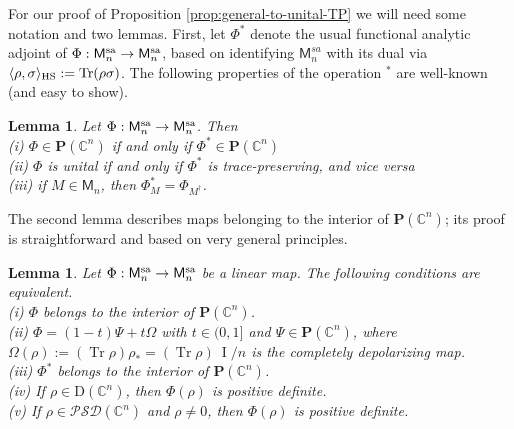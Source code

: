 \documentclass[10pt]{article}
\DeclareMathOperator{\tr}{Tr}
\DeclareMathOperator{\Id}{I}
\newcommand{\cD}{\mathrm{D}}
\newcommand{\PSD}{\mathcal{PSD}}
\newcommand{\cP}{\bm{P}}
\newcommand{\C}{\mathbb{C}}
\newcommand{\cM}{\mathsf{M}}
\newcommand{\scalar}[2]{\langle #1 , #2\rangle}
\newcommand{\sa}{\textnormal{sa}}
\newcommand{\HS}{\textnormal{HS}}
\theoremstyle{plain}
\newtheorem{lemma}[theorem]{Lemma}
\theoremstyle{definition}
\theoremstyle{remark}
\begin{document}
For our proof of  Proposition \ref{prop:general-to-unital-TP} we will need some notation and two lemmas. 
First, let $\Phi^*$ denote the usual functional analytic adjoint of $\Phi  : \cM_n^{\sa} \to \cM_n^{\sa}$, 
based on identifying $\cM_n^{sa}$ 
with its dual via  $\scalar{\rho}{\sigma}_{\HS} := \tr ({\rho}{\sigma})$.  
The following properties of the operation $^*$  are well-known (and easy to show). 


\begin{lemma} \label{lemma:star-properties} 
Let $\Phi  : \cM_n^{\sa} \to \cM_n^{\sa}$. Then \\
(i) $\Phi \in \cP(\C^n)$ if and only if  $\Phi^* \in \cP(\C^n)$ \\ 
(ii) $\Phi$  is unital  if and only if  $\Phi^*$ is trace-preserving, and vice versa \\
(iii) if $M\in \cM_n$, then $\Phi_M^* = \Phi_{M^\dagger}$. 
\end{lemma} 


The second lemma describes maps belonging to the interior of $\cP(\C^n)$;  
its proof is %
straightforward and based on very general principles.  

\begin{lemma} \label{lemma:interior}
Let $\Phi : \cM_n^{\sa} \to \cM_n^{\sa}$ be a linear map. The following conditions are equivalent.\\
(i) $\Phi$ belongs to the interior of $\cP(\C^n)$. \\
(ii) $\Phi = (1-t) \Psi + t\Omega$ with $t\in (0,1]$ and $\Psi  \in \cP(\C^n)$, where  
$\Omega(\rho) := (\tr \rho)\rho_* = (\tr \rho)~\Id/n$ 
is the completely depolarizing map.  \\
(iii) $\Phi^*$ belongs to the interior of $\cP(\C^n)$.  \\
(iv) If $\rho \in \cD(\C^n)$, then $\Phi(\rho)$ is positive definite. \\
(v) If $\rho \in \PSD(\C^n)$ and  $\rho \neq 0$, then $\Phi(\rho)$ is positive definite.
\end{lemma} 
\end{document}
